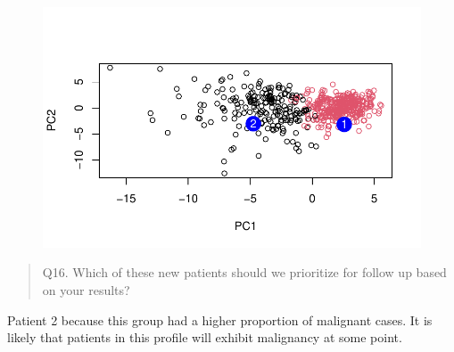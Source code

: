 \documentclass[
  letterpaper,
  DIV=11,
  numbers=noendperiod]{scrartcl}
\begin{document}
\begin{figure}[H]

{\centering \includegraphics{Class-8-mini-project_files/figure-pdf/unnamed-chunk-20-1.pdf}

}

\end{figure}

\begin{quote}
Q16. Which of these new patients should we prioritize for follow up
based on your results?
\end{quote}

Patient 2 because this group had a higher proportion of malignant cases.
It is likely that patients in this profile will exhibit malignancy at
some point.
\end{document}
